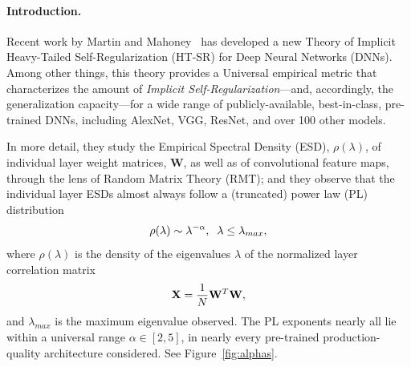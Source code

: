 \vspace{-3mm}
\paragraph{Introduction.}

Recent work by Martin and Mahoney~\cite{MM18_TR,MM19_HTSR_ICML} has developed a new Theory of Implicit Heavy-Tailed Self-Regularization (HT-SR) for Deep Neural Networks (DNNs). 
Among other things, this theory provides a Universal empirical metric that characterizes the amount of \emph{Implicit Self-Regularization}---and, accordingly, the generalization capacity---for a wide range of publicly-available, best-in-class, pre-trained DNNs, including AlexNet, VGG, ResNet, 
and over 100 other models.

In more detail, they study the Empirical Spectral Density (ESD), $\rho(\lambda)$, of individual layer weight matrices, $\mathbf{W}$, as well as of convolutional feature maps, through the lens of Random Matrix Theory (RMT); and they observe that the individual layer ESDs almost always follow a (truncated) power law (PL) distribution
\vspace{-2mm}
\begin{equation}
\rho(\lambda)\sim\lambda^{-\alpha},\;\;\lambda\le\lambda_{max},
\label{eqn:eigenval_pl}
\vspace{-1mm}
\end{equation}
where $\rho(\lambda)$ is the density of the eigenvalues $\lambda$ of the normalized layer correlation matrix 
\vspace{-2mm}
\begin{equation}
 \mathbf{X} = \frac{1}{N}\mathbf{W}^{T}\mathbf{W},
\vspace{-1mm}
\end{equation}
and $\lambda_{max}$ is the maximum eigenvalue observed.
The PL exponents nearly all lie within a universal range $\alpha\in[2,5]$, in nearly every pre-trained production-quality architecture considered.
See Figure~\ref{fig:alphas}.

